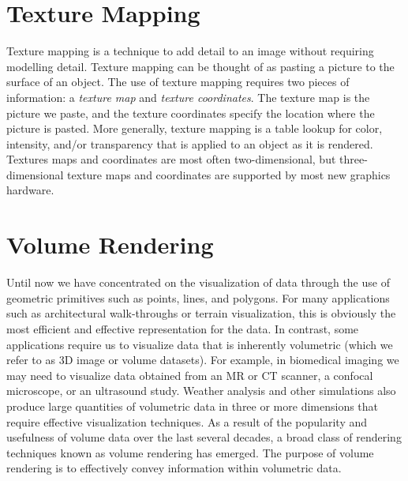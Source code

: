 \section{Texture Mapping}

Texture mapping is a technique to add detail to an image without requiring modelling detail. Texture mapping can be thought of as pasting a picture to the surface of an object. The use of texture mapping requires two pieces of information: a \emph{texture map} and \emph{texture coordinates}. The texture map is the picture we paste, and the texture coordinates specify the location where the picture is pasted. More generally, texture mapping is a table lookup for color, intensity, and/or transparency that is applied to an object as it is rendered. Textures maps and coordinates are most often two-dimensional,
but three-dimensional texture maps and coordinates are supported by most new graphics hardware.

\section{Volume Rendering}
\label{sec:volume_rendering}

Until now we have concentrated on the visualization of data through the use of geometric primitives such as points, lines, and polygons.
For many applications such as architectural walk-throughs or terrain visualization, this is obviously the most efficient and effective representation for the data.
In contrast, some applications require us to visualize data that is inherently volumetric (which we refer to as 3D image or volume datasets).
For example, in biomedical imaging we may need to visualize data obtained from an MR or CT scanner, a confocal microscope, or an ultrasound study.
Weather analysis and other simulations also produce large quantities of volumetric data in three or more dimensions that require effective visualization techniques.
As a result of the popularity and usefulness of volume data over the last several decades, a broad class of rendering techniques known as volume rendering has emerged. The purpose of volume rendering is to effectively convey information within volumetric data.
